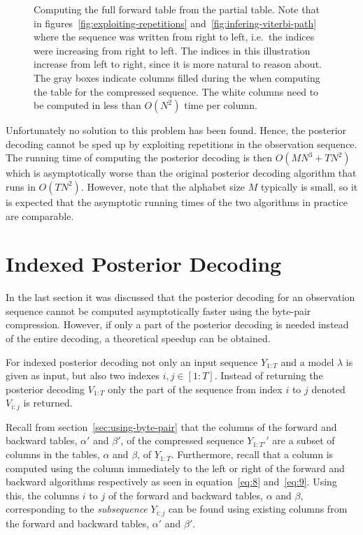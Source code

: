\begin{figure}
  \centering
  
  \caption{Computing the full forward table from the partial table. Note that
    in figures~\ref{fig:exploiting-repetitions}
    and~\ref{fig:infering-viterbi-path} where the sequence was written from
    right to left, i.e.\ the indices were increasing from right to left. The
    indices in this illustration increase from left to right, since it is
    more natural to reason about. The gray boxes indicate columns filled during
    the when computing the table for the compressed sequence. The white columns
    need to be computed in less than $O(N^2)$ time per column.}
  \label{fig:full-forward-table}
\end{figure}

Unfortunately no solution to this problem has been found. Hence, the posterior
decoding cannot be sped up by exploiting repetitions in the observation
sequence. The running time of computing the posterior decoding is then
$O(M N^3 + TN^2)$ which is asymptotically worse than the original posterior
decoding algorithm that runs in $O(TN^2)$. However, note that the alphabet size
$M$ typically is small, so it is expected that the asymptotic running times of
the two algorithms in practice are comparable.

\section{Indexed Posterior Decoding}

In the last section it was discussed that the posterior decoding for an
observation sequence cannot be computed asymptotically faster using the byte-pair
compression. However, if only a part of the posterior decoding is needed
instead of the entire decoding, a theoretical speedup can be obtained.

For indexed posterior decoding not only an input sequence $Y_{1:T}$ and a model
$\lambda$ is given as input, but also two indexes $i,j \in [1:T]$. Instead of
returning the posterior decoding $V_{1:T}$ only the part of the sequence
from index $i$ to $j$ denoted $V_{i:j}$ is returned.

Recall from section~\ref{sec:using-byte-pair} that the columns of the forward
and backward tables, $\alpha'$ and $\beta'$, of the compressed sequence
$Y_{1:T'}'$ are a subset of columns in the tables, $\alpha$ and $\beta$, of
$Y_{1:T}$. Furthermore, recall that a column is computed using the column
immediately to the left or right of the forward and backward algorithms
respectively as seen in equation~\eqref{eq:8} and~\eqref{eq:9}. Using this, the
columns $i$ to $j$ of the forward and backward tables, $\alpha$ and $\beta$,
corresponding to the \emph{subsequence} $Y_{i:j}$ can be found using existing
columns from the forward and backward tables, $\alpha'$ and $\beta'$.

